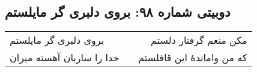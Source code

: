 \begin{center}
\section*{دوبیتی شماره ۹۸: بروی دلبری گر مایلستم}
\label{sec:098}
\begin{longtable}{l p{0.5cm} r}
بروی دلبری گر مایلستم
&&
مکن منعم گرفتار دلستم
\\
خدا را ساربان آهسته میران
&&
که من واماندهٔ این قافلستم
\\
\end{longtable}
\end{center}

